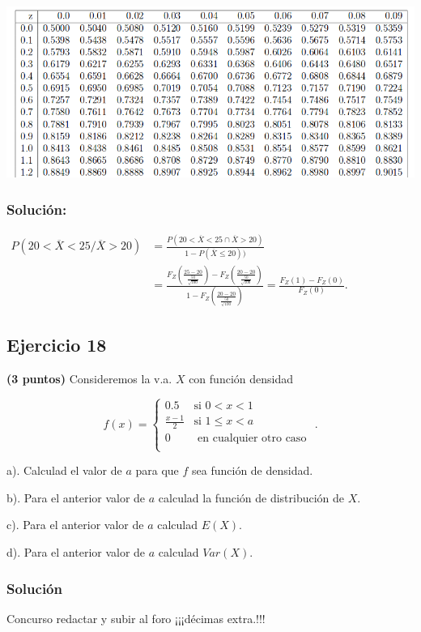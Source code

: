 \documentclass[
]{article}
\begin{document}
\includegraphics{normal1examen.jpg}

\hypertarget{soluciuxf3n-16}{%
\subsubsection{Solución:}\label{soluciuxf3n-16}}

\(\begin{aligned} P(20< \overline{X}<25 /\overline{X}>20)&=\frac{P(20< \overline{X}<25\cap \overline{X}>20)}{1-P( \overline{X}\leq 20))}\\ &=\frac{F_Z\left(\frac{25-20}{\frac{50}{\sqrt{100}}}\right)-F_Z\left(\frac{20-20}{\frac{50}{\sqrt{100}}}\right)}{1-F_Z\left(\frac{20-20}{\frac{50}{\sqrt{100}}}\right)}= \frac{F_Z(1)-F_Z(0)}{F_Z(0)}. \end{aligned}\)

\hypertarget{ejercicio-18}{%
\subsection{Ejercicio 18}\label{ejercicio-18}}

\textbf{(3 puntos)} Consideremos la v.a. \(X\) con función densidad

\[f(x)=\left\{
\begin{array}{cl}
 \displaystyle 0.5& \mbox{si } 0< x <1 \\
\displaystyle\frac{x-1}{2} & \mbox{si } 1\leq x < a \\
 \displaystyle 0 & \mbox{ en cualquier otro caso } \\
\end{array}\right..
\]

a). Calculad el valor de \(a\) para que \(f\) sea función de densidad.

b). Para el anterior valor de \(a\) calculad la función de distribución
de \(X\).

c). Para el anterior valor de \(a\) calculad \(E(X)\).

d). Para el anterior valor de \(a\) calculad \(Var(X)\).

\hypertarget{soluciuxf3n-17}{%
\subsubsection{Solución}\label{soluciuxf3n-17}}

Concurso redactar y subir al foro ¡¡¡décimas extra.!!!
\end{document}
